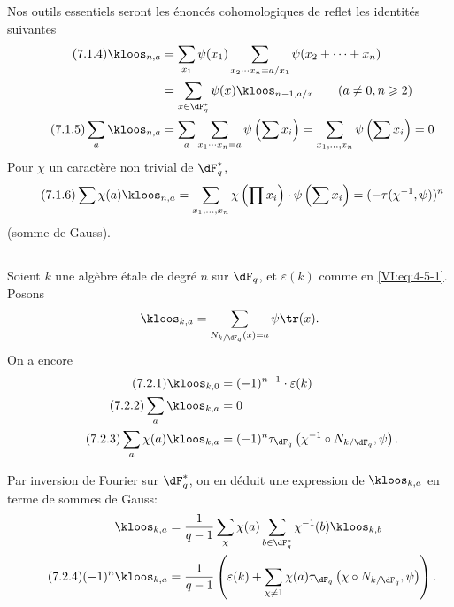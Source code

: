 Nos outils essentiels seront les énoncés cohomologiques de reflet les 
identités suivantes 
\begin{align*}\tag{7.1.4}\label{VI:eq:7-1-4}
  \kloos_{n,a} &= \sum_{x_1} \psi(x_1) \sum_{x_2\dotsm x_n = a/x_1} \psi(x_2+\cdots + x_n) \\ \notag
    &= \sum_{x\in \dF_q^\ast} \psi(x) \kloos_{n-1,a/x} \qquad (a\ne 0,n\geqslant 2) \\ \tag{7.1.5}\label{VI:eq:7-1-5}
  \sum_a \kloos_{n,a} &= \sum_a \sum_{x_1 \dotsm x_n = a} \psi\left(\sum x_i\right) = \sum_{x_1,\dots,x_n} \psi\left(\sum x_i\right) = 0 
\end{align*}
Pour $\chi$ un caractère non trivial de $\dF_q^\ast$, 
\begin{equation*}\tag{7.1.6}\label{VI:eq:7-1-6}
  \sum \chi(a) \kloos_{n,a} = \sum_{x_1,\dots,x_n} \chi\left(\prod x_i\right) \cdot \psi\left(\sum x_i\right) = (-\tau(\chi^{-1},\psi))^n 
\end{equation*}
(somme de Gauss). 





\subsection{}\label{VI:7-2}

Soient $k$ une algèbre étale de degré $n$ sur $\dF_q$, et $\varepsilon(k)$ 
comme en \eqref{VI:eq:4-5-1}. Posons 
\[
  \kloos_{k,a} = \sum_{N_{k/\dF_q}(x)=a} \psi \tr(x) \text{.} 
\]
On a encore 
\begin{align*}\tag{7.2.1}\label{VI:eq:7-2-1}
  \kloos_{k,0} &= (-1)^{n-1} \cdot \varepsilon(k) \\ \tag{7.2.2}\label{VI:eq:7-2-2}
  \sum_a \kloos_{k,a} &= 0 \\ \tag{7.2.3}\label{VI:eq:7-2-3}
  \sum_a \chi(a) \kloos_{k,a} &= (-1)^n \tau_{\dF_q}\left(\chi^{-1}\circ N_{k/\dF_q},\psi\right) \text{.} 
\end{align*}

Par inversion de Fourier sur $\dF_q^\ast$, on en déduit une expression de 
$\kloos_{k,a}$ en terme de sommes de Gauss: 
\begin{align*} 
  \kloos_{k,a} &= \frac{1}{q-1} \sum_\chi \chi(a) \sum_{b\in \dF_q^\ast} \chi^{-1}(b) \kloos_{k,b} \\ \tag{7.2.4}\label{VI:eq:7-2-4}
  (-1)^n \kloos_{k,a} &= \frac{1}{q-1} \left(\varepsilon(k) + \sum_{\chi\ne 1} \chi(a) \tau_{\dF_q}\left(\chi\circ N_{k/\dF_q},\psi\right) \right) \text{.} 
\end{align*}

